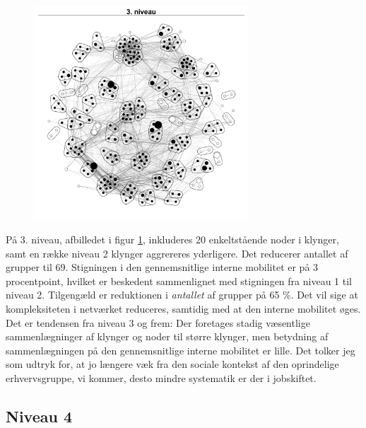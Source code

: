 \begin{figure}
  \vspace{-20pt}
  \begin{center}
   \caption{}
   \label{fig_delanalyse1_kort_seg_proces3}
    \includegraphics[width=8cm]{fig/netvaerkskort/kort_seg_proces3.pdf}
    \label{fig_delanalyse1_kort_seg_proces3}
  \end{center}
  \vspace{-20pt}
\end{figure}

På 3. niveau, afbilledet i figur \ref{fig_delanalyse1_kort_seg_proces3}, inkluderes 20 enkeltstående noder i klynger, samt en række niveau 2 klynger aggrereres yderligere. Det reducerer antallet af grupper til 69. Stigningen i den gennemsnitlige interne mobilitet er på 3 procentpoint, hvilket er beskedent sammenlignet med stigningen fra niveau 1 til niveau 2. Tilgengæld er reduktionen i \emph{antallet} af grupper på 65 \%. Det vil sige at kompleksiteten i netværket reduceres, samtidig med at den interne mobilitet øges. Det er tendensen fra niveau 3 og frem: Der foretages stadig væsentlige sammenlægninger af klynger og noder til større klynger, men betydning af sammenlægningen på den gennemsnitlige interne mobilitet er lille. Det tolker jeg som udtryk for, at jo længere væk fra den sociale kontekst af den oprindelige erhvervsgruppe, vi kommer, desto mindre systematik er der i jobskiftet. 


\newpage \subsection{Niveau 4}

